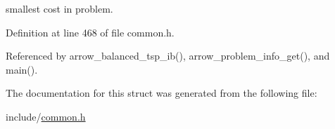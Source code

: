 smallest cost in problem. 

Definition at line 468 of file common.h.

Referenced by arrow\_\-balanced\_\-tsp\_\-ib(), arrow\_\-problem\_\-info\_\-get(), and main().

The documentation for this struct was generated from the following file:\begin{CompactItemize}
\item 
include/\hyperlink{common_8h}{common.h}\end{CompactItemize}
